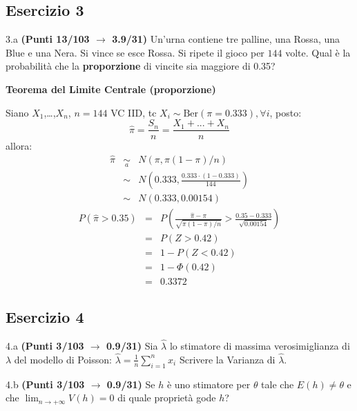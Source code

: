 \documentclass[
  11pt,
]{book}
\theoremstyle{mytheoremstyle}
\theoremstyle{mydefstyle}
\newenvironment{sol}
  {
  \begin{tcolorbox}[enhanced,breakable,arc=0.1mm,boxrule=1pt,colback=white,colframe=iblue,
  title=\bf \fontfamily{lmss}\selectfont \hspace{.5 cm} Soluzione,drop fuzzy shadow]

}{
\end{tcolorbox}
  }
\begin{document}
\subsection{Esercizio 3}\label{esercizio-3-15}

3.a \textbf{(Punti 13/103 \(\rightarrow\) 3.9/31)} Un'urna contiene tre palline, una Rossa, una Blue e una Nera. Si vince
se esce Rossa. Si ripete il gioco per \(144\) volte. Qual è la probabilità che la
\textbf{proporzione} di vincite sia maggiore di 0.35?

\begin{sol}
\textbf{Teorema del Limite Centrale (proporzione)}

Siano \(X_1\),\ldots,\(X_n\), \(n=144\) VC IID, tc \(X_i\sim\text{Ber}(\pi=0.333)\)\(,\forall i\), posto:
\[
      \hat\pi=\frac{S_n}n = \frac{X_1 + ... + X_n}n
      \]
allora:\begin{eqnarray*}
  \hat\pi & \mathop{\sim}\limits_{a}& N(\pi,\pi(1-\pi)/n) \\
  &\sim & N\left(0.333,\frac{0.333\cdot(1-0.333)}{144}\right) \\
     &\sim & N(0.333,0.00154) 
  \end{eqnarray*}\begin{eqnarray*}
      P( \hat\pi   >   0.35 ) 
        &=& P\left(  \frac { \hat\pi  -  \pi }{ \sqrt{\pi(1-\pi)/n} }  >  \frac { 0.35  -  0.333 }{\sqrt{ 0.00154 }} \right)  \\
                 &=& P\left(  Z   >   0.42 \right) \\    &=& 1-P(Z< 0.42 )\\ 
                 &=&  1-\Phi( 0.42 ) \\ &=&  0.3372 
      \end{eqnarray*}

\end{sol}

\subsection{Esercizio 4}\label{esercizio-4-15}

4.a \textbf{(Punti 3/103 \(\rightarrow\) 0.9/31)} Sia \(\hat \lambda\) lo stimatore di massima verosimiglianza di \(\lambda\) del modello di Poisson: \(\hat\lambda =  \frac 1n\sum_{i=1}^nx_i\)
Scrivere la Varianza di \(\hat \lambda\).

4.b \textbf{(Punti 3/103 \(\rightarrow\) 0.9/31)} Se \(h\) è uno stimatore per \(\theta\) tale che
\(E(h)\ne \theta\) e che \(\lim_ {n\to +\infty}V(h)=0\) di quale proprietà gode \(h\)?
\end{document}
